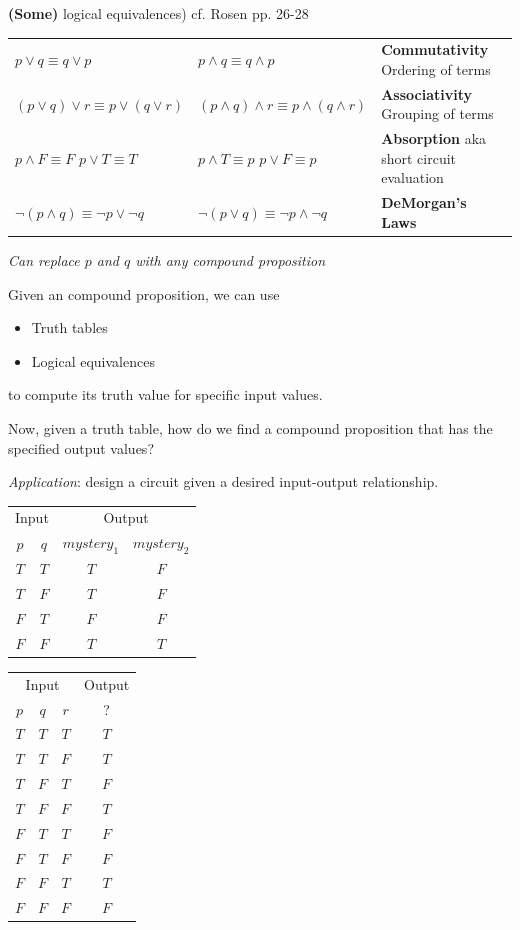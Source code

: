\documentclass[12pt, oneside]{article}
\begin{document}
{\bf (Some)} logical equivalences) cf. Rosen pp. 26-28

\begin{tabular}{llp{3in}}
$p \lor q \equiv q \lor p$ & $p \land q \equiv q \land p$ & {\bf Commutativity} Ordering of terms\\
$(p \lor q) \lor r  \equiv p \lor (q \lor r)$ & $(p \land q) \land r  \equiv p \land (q \land r)$ & {\bf Associativity} Grouping of terms\\
$p \land F \equiv F$ \qquad $p \lor T \equiv T$ & $p \land T \equiv p$ \qquad $p \lor F \equiv p$ & {\bf Absorption} aka 
short circuit evaluation\\
$\lnot (p \land q) \equiv \lnot p \lor \lnot q$ & $\lnot (p \lor q) \equiv \lnot p \land\lnot q$  & {\bf DeMorgan's Laws}\end{tabular}


{\it Can replace $p$ and $q$ with any compound proposition}

\vfill

\newpage
Given an compound proposition, we can use
\begin{itemize}
\item Truth tables
\item Logical equivalences
\end{itemize}
to compute its truth value for specific input values.

Now, given a truth table, how do we find a compound proposition that has the specified output values?

{\it Application}: design a circuit given a desired input-output relationship.

\begin{center}
\begin{tabular}{cc||cc}
\multicolumn{2}{c||}{Input}  &\multicolumn{2}{c}{Output}\\
$p$ & $q$& $mystery_1$ & $mystery_2$\\
\hline
$T$ & $T$  & $T$ & $F$\\
$T$ & $F$  & $T$ & $F$\\
$F$ & $T$  & $F$ & $F$\\
$F$ & $F$  & $T$ & $T$\\
\end{tabular}
\qquad \qquad
\begin{tabular}{ccc||c}
\multicolumn{3}{c||}{Input}  & Output\\
$p$ & $q$ & $r$  &  ?\\
\hline
$T$ & $T$  & $T$ & $T$ \\
$T$ & $T$  & $F$ & $T$ \\
$T$ & $F$  & $T$ & $F$ \\
$T$ & $F$  & $F$ & $T$ \\
$F$ & $T$  & $T$ & $F$ \\
$F$ & $T$  & $F$ & $F$ \\
$F$ & $F$  & $T$ & $T$ \\
$F$ & $F$  & $F$ & $F$ \\
\end{tabular}

\end{center}
\end{document}
